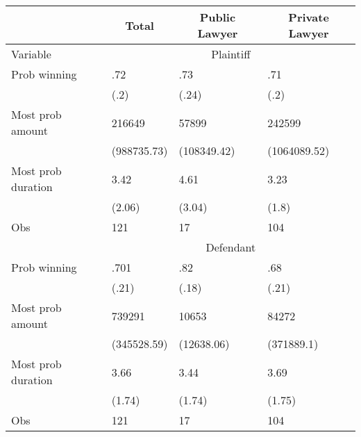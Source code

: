 \begin{tabular}{llll}
      & \multicolumn{1}{c}{Total} & \multicolumn{1}{c}{Public Lawyer} & \multicolumn{1}{c}{Private Lawyer} \\
\midrule
Variable & \multicolumn{3}{c}{Plaintiff} \\
\midrule
\midrule
Prob winning & .72   & .73   & .71 \\
      & (.2)  & (.24) & (.2) \\
Most prob amount & 216649 & 57899 & 242599 \\
      & (988735.73) & (108349.42) & (1064089.52) \\
Most prob duration & 3.42  & 4.61  & 3.23 \\
      & (2.06) & (3.04) & (1.8) \\
Obs   & 121   & 17    & 104 \\
\cmidrule{2-4}      & \multicolumn{3}{c}{Defendant} \\
\cmidrule{2-4}Prob winning & .701 & .82 & .68 \\
      & (.21) & (.18) & (.21) \\
Most prob amount & 739291 & 10653 & 84272 \\
      & (345528.59) & (12638.06) & (371889.1) \\
Most prob duration & 3.66  & 3.44  & 3.69 \\
      & (1.74) & (1.74) & (1.75) \\
Obs   & 121   & 17    & 104 \\
\bottomrule
\end{tabular}%
